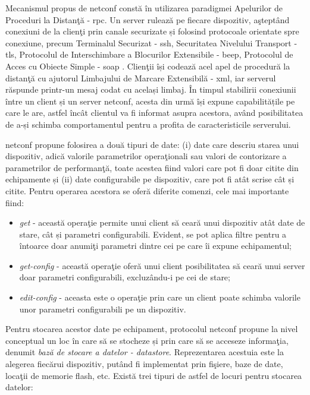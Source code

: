 Mecanismul propus de \gls{netconf} constă în utilizarea paradigmei Apelurilor de Proceduri la Distanţă - \gls{rpc}. Un server rulează pe fiecare dispozitiv, aşteptând conexiuni de la clienţi prin canale securizate și folosind protocoale orientate spre conexiune, precum Terminalul Securizat - \gls{ssh}, Securitatea Nivelului Transport - \gls{tls}, Protocolul de Interschimbare a Blocurilor Extensibile - \gls{beep}, Protocolul de Acces cu Obiecte Simple - \gls{soap} \cite{ji2009challenges}. Clienţii își codează acel apel de procedură la distanţă cu ajutorul Limbajului de Marcare Extensibilă - \gls{xml}, iar serverul răspunde printr-un mesaj codat cu același limbaj. În timpul stabilirii conexiunii între un client și un server \gls{netconf}, acesta din urmă își expune capabilitățile pe care le are, astfel încât clientul va fi informat asupra acestora, având posibilitatea de a-și schimba comportamentul pentru a profita de caracteristicile serverului.

\gls{netconf} propune folosirea a două tipuri de date: (i) date care descriu starea unui dispozitiv, adică valorile parametrilor operaţionali sau valori de contorizare a parametrilor de performanţă, toate acestea fiind valori care pot fi doar citite din echipamente și (ii) date configurabile pe dispozitiv, care pot fi atât scrise cât și citite. Pentru operarea acestora se oferă diferite comenzi, cele mai importante fiind:

\begin{itemize}
	\item \textit{get} - această operaţie permite unui client să ceară unui dispozitiv atât date de stare, cât și parametri configurabili. Evident, se pot aplica filtre pentru a întoarce doar anumiţi parametri dintre cei pe care îi expune echipamentul;
	\item \textit{get-config} - această operaţie oferă unui client posibilitatea să ceară unui server doar parametri configurabili, excluzându-i pe cei de stare;
	\item \textit{edit-config} - aceasta este o operaţie prin care un client poate schimba valorile unor parametri configurabili pe un dispozitiv.
\end{itemize}

Pentru stocarea acestor date pe echipament, protocolul \gls{netconf} propune la nivel conceptual un loc în care să se stocheze și prin care să se acceseze informaţia, denumit \textit{bază de stocare a datelor - datastore}. Reprezentarea acestuia este la alegerea fiecărui dispozitiv, putând fi implementat prin fişiere, baze de date, locaţii de memorie flash, etc. Există trei tipuri de astfel de locuri pentru stocarea datelor:

